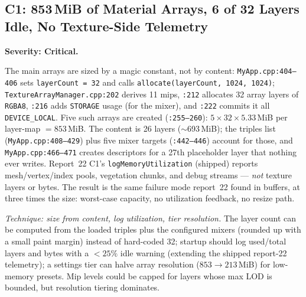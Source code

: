 \documentclass[11pt,a4paper]{article}
\begin{document}
\subsection{C1: 853\,MiB of Material Arrays, 6 of 32 Layers Idle, No Texture-Side Telemetry}
\label{sec:c1}

\textbf{Severity: Critical.}

The main arrays are sized by a magic constant, not by content:
\texttt{MyApp.cpp:404--406} sets \texttt{layerCount = 32} and calls
\texttt{allocate(layerCount, 1024, 1024)}; \texttt{TextureArrayManager.cpp:202}
derives 11 mips, \texttt{:212} allocates 32 array layers of
\texttt{RGBA8}, \texttt{:216} adds \texttt{STORAGE} usage (for the mixer), and
\texttt{:222} commits it all \texttt{DEVICE\_LOCAL}. Five such arrays are
created (\texttt{:255--260}): $5 \times 32 \times 5.33$\,MiB per layer-map
$= 853$\,MiB. The content is 26 layers ($\sim$693\,MiB); the triples list
(\texttt{MyApp.cpp:408--429}) plus five mixer targets
(\texttt{:442--446}) account for those, and \texttt{MyApp.cpp:466--471} creates
descriptors for a 27th placeholder layer that nothing ever writes. Report~22
C1's \texttt{logMemoryUtilization} (shipped) reports mesh/vertex/index pools,
vegetation chunks, and debug streams --- \emph{not} texture layers or bytes.
The result is the same failure mode report~22 found in buffers, at three times
the size: worst-case capacity, no utilization feedback, no resize path.

\textit{Technique: size from content, log utilization, tier resolution.} The
layer count can be computed from the loaded triples plus the configured mixers
(rounded up with a small paint margin) instead of hard-coded 32; startup should
log used/total layers and bytes with a $<25\%$ idle warning (extending the
shipped report-22 telemetry); a settings tier can halve array resolution
($853 \rightarrow 213$\,MiB) for low-memory presets. Mip levels could be capped
for layers whose max LOD is bounded, but resolution tiering dominates.
\end{document}
